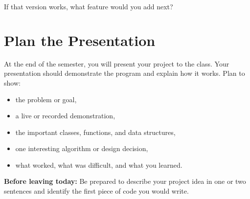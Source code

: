 \documentclass{article}
\begin{document}
If that version works, what feature would you add next?

\vspace{0.65cm}

\section{Plan the Presentation}

At the end of the semester, you will present your project to the
class. Your presentation should demonstrate the program and explain
how it works.  Plan to show:

\begin{itemize}
\item the problem or goal,
\item a live or recorded demonstration,
\item the important classes, functions, and data structures,
\item one interesting algorithm or design decision,
\item what worked, what was difficult, and what you learned.
\end{itemize}

\textbf{Before leaving today:} Be prepared to describe your project
idea in one or two sentences and identify the first piece of code you
would write.
\end{document}

